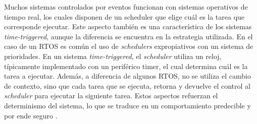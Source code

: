 


Muchos sistemas controlados por eventos funcionan con sistemas operativos de tiempo real, los cuales disponen de un scheduler que elige cuál es la tarea que corresponde ejecutar. Este aspecto también es una característica de los sistemas \textit{time-triggered}, aunque la diferencia se encuentra en la estrategia utilizada. En el caso de un RTOS es común el uso de \textit{schedulers} expropiativos con un sistema de prioridades. En un sistema \textit{time-triggered}, el \textit{scheduler} utiliza un reloj, típicamente implementado con un periférico timer, el cual determina cuál es la tarea a ejecutar. Además, a diferencia de algunos RTOS, no se utiliza el cambio de contexto, sino que cada tarea que se ejecuta, retorna y devuelve el control al \textit{scheduler} para ejecutar la siguiente tarea. Estos aspectos refuerzan el determinismo del sistema, lo que se traduce en un comportamiento predecible y por ende seguro \cite[p.~247]{pont2008patterns}.




